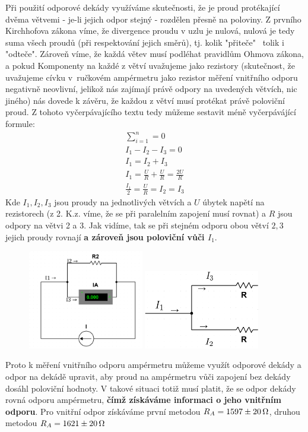 \documentclass[czech,11pt,a4paper]{article}
\begin{document}
		
		Při použití odporové dekády využíváme skutečnosti, že je proud protékající dvěma větvemi - je-li jejich odpor stejný - rozdělen přesně na poloviny. Z prvního Kirchhofova zákona víme, že divergence proudu v uzlu je nulová, nulová je tedy suma všech proudů (při respektování jejich směrů), tj. kolik "přiteče" \, tolik i "odteče". Zároveň víme, že každá větev musí podléhat pravidlům Ohmova zákona, a pokud Komponenty na každé z větví uvažujeme jako rezistory (skutečnost, že uvažujeme cívku v~ručkovém ampérmetru jako rezistor měření vnitřního odporu negativně neovlivní, jelikož nás zajímají právě odpory na uvedených větvích, nic jiného) nás dovede k závěru, že každou z větví musí protékat právě poloviční proud. Z tohoto vyčerpávajícího textu tedy můžeme sestavit méně vyčerpávájící formule:
		\begin{gather*}
			\sum_{i=1}^{n} = 0 \\
			I_1 - I_2 -I_3 = 0 \\
			{I_1 = I_2 + I_3} \\
			I_1 = \frac{U}{R} + \frac{U}{R} = \frac {2U}{R} \\
			\frac{I_1}{2} = \frac{U}{R} = I_2 = I_3
		\end{gather*}
		Kde $I_1, I_2, I_3$ jsou proudy na jednotlivých větvích a $U$ úbytek napětí na rezistorech (z 2. K.z. víme, že se při paralelním zapojení musí rovnat) a $R$ jsou odpory na větvi 2 a 3. Jak vidíme, tak se při stejném odporu obou větví $2, 3$ jejich proudy rovnají \textbf{a zároveň jsou poloviční vůči $I_1$}.
		\begin{figure}[h]\begin{center}
				
			\includegraphics[width=0.45\textwidth,]{vetev realizovana}
			\includegraphics[width=0.45\textwidth,]{vetev}
			\end{center}
		\end{figure}
		Proto k měření vnitřního odporu ampérmetru můžeme využít odporové dekády a odpor na dekádě upravit, aby proud na ampérmetru vůči zapojení bez dekády dosáhl poloviční hodnoty. V takové situaci totiž musí platit, že se odpor dekády rovná odporu ampérmetru, \textbf{čímž získáváme informaci o jeho vnitřním odporu}. Pro vnitřní odpor získáváme první metodou $R_A = 1597 \pm 20 \,\rm \Omega$, druhou metodou $R_A = 1621 \pm 20 \,\rm \Omega$
		
\end{document}
